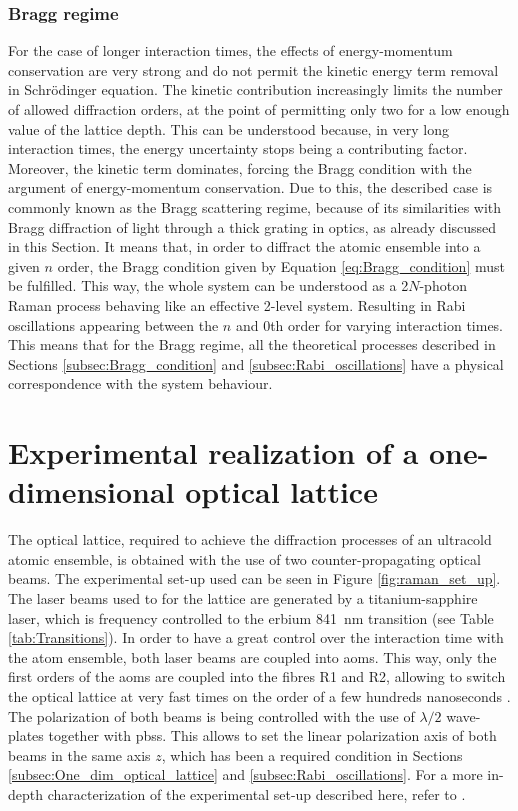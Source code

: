 \subsubsection{Bragg regime}
For the case of longer interaction times, the effects of energy-momentum conservation are very strong and do not permit the kinetic energy term removal in Schr\"odinger equation. The kinetic contribution increasingly limits the number of allowed diffraction orders, at the point of permitting only two for a low enough value of the lattice depth. This can be understood because, in very long interaction times, the energy uncertainty stops being a contributing factor. Moreover, the kinetic term dominates, forcing the Bragg condition with the argument of energy-momentum conservation. Due to this, the described case is commonly known as the Bragg scattering regime, because of its similarities with Bragg diffraction of light through a thick grating in optics, as already discussed in this Section. It means that, in order to diffract the atomic ensemble into a given $n$ order, the Bragg condition given by Equation \eqref{eq:Bragg_condition} must be fulfilled. This way, the whole system can be understood as a 2$N$-photon Raman process behaving like an effective 2-level system. Resulting in Rabi oscillations appearing between the $n$ and 0th order for varying interaction times. This means that for the Bragg regime, all the theoretical processes described in Sections \ref{subsec:Bragg_condition} and \ref{subsec:Rabi_oscillations} have a physical correspondence with the system behaviour.

\section{Experimental realization of a one-dimensional optical lattice}

The optical lattice, required to achieve the diffraction processes of an ultracold atomic ensemble, is obtained with the use of two counter-propagating optical beams. The experimental set-up used can be seen in Figure \ref{fig:raman_set_up}. The laser beams used to for the lattice are generated by a titanium-sapphire laser, which is frequency controlled to the erbium \SI{841}{\nano\meter} transition (see Table \ref{tab:Transitions}). In order to have a great control over the interaction time with the atom ensemble, both laser beams are coupled into \acp{aom}. This way, only the first orders of the \acp{aom} are coupled into the fibres R1 and R2, allowing to switch the optical lattice at very fast times on the order of a few hundreds nanoseconds \cite{Helten2019}. The polarization of both beams is being controlled with the use of $\lambda/2$ wave-plates together with \acfp{pbs}. This allows to set the linear polarization axis of both beams in the same axis $z$, which has been a required condition in Sections \ref{subsec:One_dim_optical_lattice} and \ref{subsec:Rabi_oscillations}. For a more in-depth characterization of the experimental set-up described here, refer to \cite{Helten2019}.



